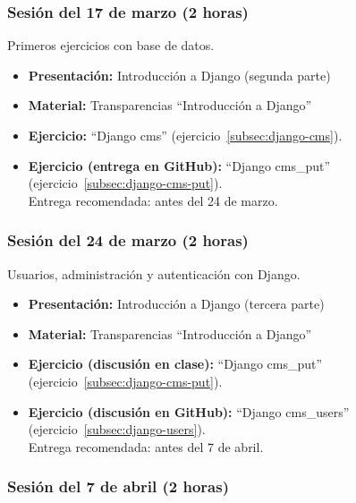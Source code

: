 \documentclass[a4paper,12pt]{article}
\begin{document}
\subsubsection{Sesión del 17 de marzo (2 horas)}

Primeros ejercicios con base de datos.

\begin{itemize}
 \item \textbf{Presentación:} Introducción a Django (segunda parte)
 \item \textbf{Material:} Transparencias ``Introducción a Django''

 \item \textbf{Ejercicio:} ``Django cms'' (ejercicio~\ref{subsec:django-cms}).
 \item \textbf{Ejercicio (entrega en GitHub):} ``Django cms\_put'' (ejercicio~\ref{subsec:django-cms-put}).\\
    Entrega recomendada: antes del 24 de marzo.
 
\end{itemize}

\subsubsection{Sesión del 24 de marzo (2 horas)}

Usuarios, administración y autenticación con Django.

\begin{itemize}
 \item \textbf{Presentación:} Introducción a Django (tercera parte)
 \item \textbf{Material:} Transparencias ``Introducción a Django''
  \item \textbf{Ejercicio (discusión en clase):} ``Django cms\_put'' (ejercicio~\ref{subsec:django-cms-put}).
 \item \textbf{Ejercicio (discusión en GitHub):} ``Django cms\_users'' (ejercicio~\ref{subsec:django-users}). \\
 Entrega recomendada: antes del 7 de abril.
\end{itemize}


\subsubsection{Sesión del 7 de abril (2 horas)}
\end{document}
